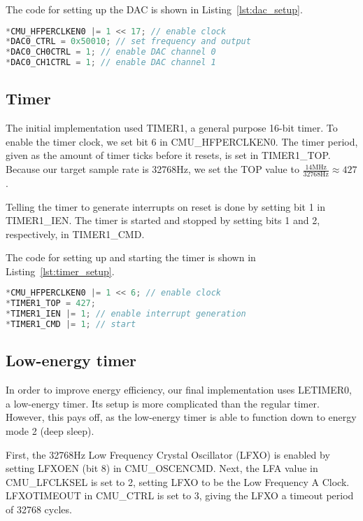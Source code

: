 The code for setting up the DAC is shown in Listing~\ref{lst:dac_setup}.

\begin{lstlisting}[language=c, label=lst:dac_setup, caption=Setting up DAC0.]
*CMU_HFPERCLKEN0 |= 1 << 17; // enable clock
*DAC0_CTRL = 0x50010; // set frequency and output
*DAC0_CH0CTRL = 1; // enable DAC channel 0
*DAC0_CH1CTRL = 1; // enable DAC channel 1
\end{lstlisting}

\subsection{Timer}
The initial implementation used TIMER1, a general purpose 16-bit timer. To enable the timer clock, we set bit 6 in CMU\_HFPERCLKEN0. The timer period, given as the amount of timer ticks before it resets, is set in TIMER1\_TOP. Because our target sample rate is 32768Hz, we set the TOP value to $\frac{14\mathrm{MHz}}{32768\mathrm{Hz}} \approx 427$. 

Telling the timer to generate interrupts on reset is done by setting bit 1 in TIMER1\_IEN. The timer is started and stopped by setting bits 1 and 2, respectively, in TIMER1\_CMD.

The code for setting up and starting the timer is shown in Listing~\ref{lst:timer_setup}.

\begin{lstlisting}[language=c, label=lst:timer_setup, caption=Setting up and starting TIMER1.]
*CMU_HFPERCLKEN0 |= 1 << 6; // enable clock
*TIMER1_TOP = 427;
*TIMER1_IEN |= 1; // enable interrupt generation
*TIMER1_CMD |= 1; // start
\end{lstlisting}

\subsection{Low-energy timer}
In order to improve energy efficiency, our final implementation uses LETIMER0, a low-energy timer. Its setup is more complicated than the regular timer. However, this pays off, as the low-energy timer is able to function down to energy mode 2 (deep sleep).

First, the 32768Hz Low Frequency Crystal Oscillator (LFXO) is enabled by setting LFXOEN (bit 8) in CMU\_OSCENCMD. Next, the LFA value in CMU\_LFCLKSEL is set to 2, setting LFXO to be the Low Frequency A Clock. LFXOTIMEOUT in CMU\_CTRL is set to 3, giving the LFXO a timeout period of 32768 cycles.

